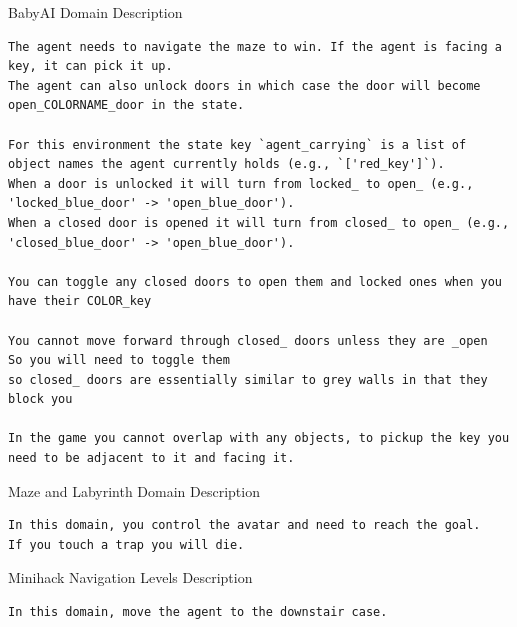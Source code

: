 \documentclass{article}
\theoremstyle{plain}
\theoremstyle{definition}
\theoremstyle{remark}
\begin{document}
\begin{mybox}[boxrule=0pt, parbox=false, opacityframe=1, colframe=black, label=box:babyai_domain_description]{BabyAI Domain Description}
\begin{lstlisting}[basicstyle=\ttfamily\small, breaklines=true]
The agent needs to navigate the maze to win. If the agent is facing a key, it can pick it up.
The agent can also unlock doors in which case the door will become 
open_COLORNAME_door in the state.

For this environment the state key `agent_carrying` is a list of object names the agent currently holds (e.g., `['red_key']`).
When a door is unlocked it will turn from locked_ to open_ (e.g., 'locked_blue_door' -> 'open_blue_door').
When a closed door is opened it will turn from closed_ to open_ (e.g., 'closed_blue_door' -> 'open_blue_door').

You can toggle any closed doors to open them and locked ones when you have their COLOR_key

You cannot move forward through closed_ doors unless they are _open 
So you will need to toggle them 
so closed_ doors are essentially similar to grey walls in that they block you

In the game you cannot overlap with any objects, to pickup the key you need to be adjacent to it and facing it.
\end{lstlisting}

\end{mybox}

\begin{mybox}[boxrule=0pt, parbox=false, opacityframe=1, colframe=black, label=box:maze_and_labyrinth_domain_description]{Maze and Labyrinth Domain Description}
\begin{lstlisting}[basicstyle=\ttfamily\small, breaklines=true]
In this domain, you control the avatar and need to reach the goal.
If you touch a trap you will die.
\end{lstlisting}

\end{mybox}

\begin{mybox}[boxrule=0pt, parbox=false, opacityframe=1, colframe=black, label=box:minihack_domain_description]{Minihack Navigation Levels Description}
\begin{lstlisting}[basicstyle=\ttfamily\small, breaklines=true]
In this domain, move the agent to the downstair case.

\end{lstlisting}
\end{mybox}
\end{document}
